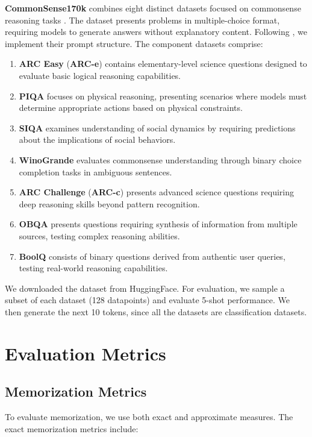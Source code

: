 \textbf{CommonSense170k} combines eight distinct datasets focused on commonsense reasoning tasks \citep{cr-dataset}. The dataset presents problems in multiple-choice format, requiring models to generate answers without explanatory content. Following \citep{cr-dataset}, we implement their prompt structure. The component datasets comprise:
\begin{enumerate}

    \item \textbf{ARC Easy} (\textbf{ARC-e}) \citep{clark2018think} contains elementary-level science questions designed to evaluate basic logical reasoning capabilities.
    \item \textbf{PIQA} \citep{bisk2020piqa} focuses on physical reasoning, presenting scenarios where models must determine appropriate actions based on physical constraints.
    \item \textbf{SIQA} \citep{sap2019socialiqa} examines understanding of social dynamics by requiring predictions about the implications of social behaviors.
    \item \textbf{WinoGrande} \citep{sakaguchi2021winogrande} evaluates commonsense understanding through binary choice completion tasks in ambiguous sentences.
    \item \textbf{ARC Challenge} (\textbf{ARC-c}) \citep{clark2018think} presents advanced science questions requiring deep reasoning skills beyond pattern recognition.
    \item \textbf{OBQA} \citep{mihaylov2018can} presents questions requiring synthesis of information from multiple sources, testing complex reasoning abilities.
    \item \textbf{BoolQ} \citep{clark2019boolq} consists of binary questions derived from authentic user queries, testing real-world reasoning capabilities.
\end{enumerate}

We downloaded the dataset from HuggingFace. For evaluation, we sample a subset of each dataset (128 datapoints) and evaluate 5-shot performance. We then generate the next 10 tokens, since all the datasets are classification datasets. 
\section{Evaluation Metrics}

\subsection{Memorization Metrics}
To evaluate memorization, we use both exact and approximate measures. The exact memorization metrics include:

